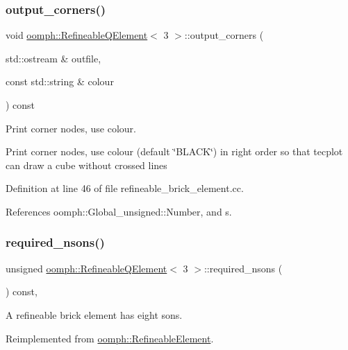 \subsubsection{\texorpdfstring{output\+\_\+corners()}{output\_corners()}}
{\footnotesize\ttfamily void \hyperlink{classoomph_1_1RefineableQElement}{oomph\+::\+Refineable\+Q\+Element}$<$ 3 $>$\+::output\+\_\+corners (\begin{DoxyParamCaption}\item[{std\+::ostream \&}]{outfile,  }\item[{const std\+::string \&}]{colour }\end{DoxyParamCaption}) const}



Print corner nodes, use colour. 

Print corner nodes, use colour (default \char`\"{}\+B\+L\+A\+C\+K\char`\"{}) in right order so that tecplot can draw a cube without crossed lines 

Definition at line 46 of file refineable\+\_\+brick\+\_\+element.\+cc.



References oomph\+::\+Global\+\_\+unsigned\+::\+Number, and s.

\mbox{\label{classoomph_1_1RefineableQElement_3_013_01_4_a1eff24cfc9bead67647d7df95dad97c8}} 
\subsubsection{\texorpdfstring{required\+\_\+nsons()}{required\_nsons()}}
{\footnotesize\ttfamily unsigned \hyperlink{classoomph_1_1RefineableQElement}{oomph\+::\+Refineable\+Q\+Element}$<$ 3 $>$\+::required\+\_\+nsons (\begin{DoxyParamCaption}{ }\end{DoxyParamCaption}) const\hspace{0.3cm}{\ttfamily [inline]}, {\ttfamily [virtual]}}



A refineable brick element has eight sons. 



Reimplemented from \hyperlink{classoomph_1_1RefineableElement_a9761852271f6cc9a1a0552ad7e054e4b}{oomph\+::\+Refineable\+Element}.



